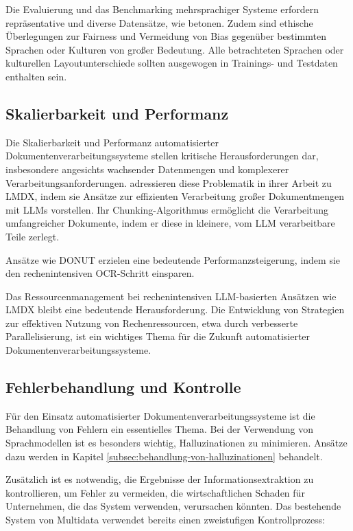 Die Evaluierung und das Benchmarking mehrsprachiger Systeme erfordern repräsentative und diverse Datensätze, wie \textcite{SubramaniNishant2021ASoD} betonen. Zudem sind ethische Überlegungen zur Fairness und Vermeidung von Bias gegenüber bestimmten Sprachen oder Kulturen von großer Bedeutung. Alle betrachteten Sprachen oder kulturellen Layoutunterschiede sollten ausgewogen in Trainings- und Testdaten enthalten sein.

\subsection{Skalierbarkeit und Performanz}
\label{subsec:skalierbarkeit-und-performanz}

Die Skalierbarkeit und Performanz automatisierter Dokumentenverarbeitungssysteme stellen kritische Herausforderungen dar, insbesondere angesichts wachsender Datenmengen und komplexerer Verarbeitungsanforderungen. \textcite{PerotVincent2024LLMD} adressieren diese Problematik in ihrer Arbeit zu \gls{LMDX}, indem sie Ansätze zur effizienten Verarbeitung großer Dokumentmengen mit \glspl{LLM} vorstellen. Ihr Chunking-Algorithmus ermöglicht die Verarbeitung umfangreicher Dokumente, indem er diese in kleinere, vom \gls{LLM} verarbeitbare Teile zerlegt.

Ansätze wie \gls{DONUT} \parencite{KimGeewook2022ODUT} erzielen eine bedeutende Performanzsteigerung, indem sie den rechenintensiven \gls{OCR}-Schritt einsparen.

Das Ressourcenmanagement bei rechenintensiven \gls{LLM}-basierten Ansätzen wie \gls{LMDX} \parencite{PerotVincent2024LLMD} bleibt eine bedeutende Herausforderung. Die Entwicklung von Strategien zur effektiven Nutzung von Rechenressourcen, etwa durch verbesserte Parallelisierung, ist ein wichtiges Thema für die Zukunft automatisierter Dokumentenverarbeitungssysteme.

\subsection{Fehlerbehandlung und Kontrolle}
\label{subsec:fehlerbehandlung-und-kontrolle}

Für den Einsatz automatisierter Dokumentenverarbeitungssysteme ist die Behandlung von Fehlern ein essentielles Thema. Bei der Verwendung von Sprachmodellen ist es besonders wichtig, Halluzinationen zu minimieren. Ansätze dazu werden in Kapitel \ref{subsec:behandlung-von-halluzinationen} behandelt.

Zusätzlich ist es notwendig, die Ergebnisse der Informationsextraktion zu kontrollieren, um Fehler zu vermeiden, die wirtschaftlichen Schaden für Unternehmen, die das System verwenden, verursachen könnten. Das bestehende System von Multidata verwendet bereits einen zweistufigen Kontrollprozess:

